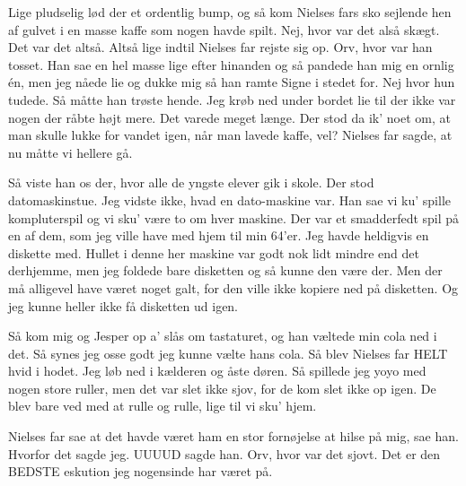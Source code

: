 \documentclass[a4paper,11pt]{article}
\begin{document}
\begin{sketch}

 Lige pludselig lød der et ordentlig bump, og så kom Nielses fars sko sejlende hen af gulvet i en masse kaffe som nogen havde spilt.
         Nej, hvor var det alså skægt. Det var det altså. Altså lige indtil Nielses far rejste sig op. Orv, hvor var han tosset.
         Han sae en hel masse lige efter hinanden og så pandede han mig en ornlig én, men jeg nåede lie og dukke mig så han ramte Signe i stedet for.
         Nej hvor hun tudede. Så måtte han trøste hende. Jeg krøb ned under bordet lie til der ikke var nogen der råbte højt mere.
         Det varede meget længe. Der stod da ik' noet om, at man skulle lukke for vandet igen, når man lavede kaffe, vel?
         Nielses far sagde, at nu måtte vi hellere gå.


 Så viste han os der, hvor alle de yngste elever gik i skole. Der stod datomaskinstue. Jeg vidste ikke, hvad en dato-maskine var.
         Han sae vi ku' spille kompluterspil og vi sku' være to om hver maskine. Der var et smadderfedt spil på en af dem,
         som jeg ville have med hjem til min 64'er. Jeg havde heldigvis en diskette med. Hullet i denne her maskine var godt nok lidt mindre
         end det derhjemme, men jeg foldede bare disketten og så kunne den være der. Men der må alligevel have været noget galt, for
         den ville ikke kopiere ned på disketten. Og jeg kunne heller ikke få disketten ud igen.


 Så kom mig og Jesper op a' slås om tastaturet, og han væltede min cola ned i det. Så synes jeg osse godt jeg kunne vælte hans cola.
         Så blev Nielses far HELT hvid i hodet. Jeg løb ned i kælderen og åste døren. Så spillede jeg yoyo med nogen store ruller,
         men det var slet ikke sjov, for de kom slet ikke op igen. De blev bare ved med at rulle og rulle, lige til vi sku' hjem.


 Nielses far sae at det havde været ham en stor fornøjelse at hilse på mig, sae han. Hvorfor det sagde jeg.
         UUUUD sagde han. Orv, hvor var det sjovt. Det er den BEDSTE eskution jeg nogensinde har været på.


\end{sketch}
\end{document}
